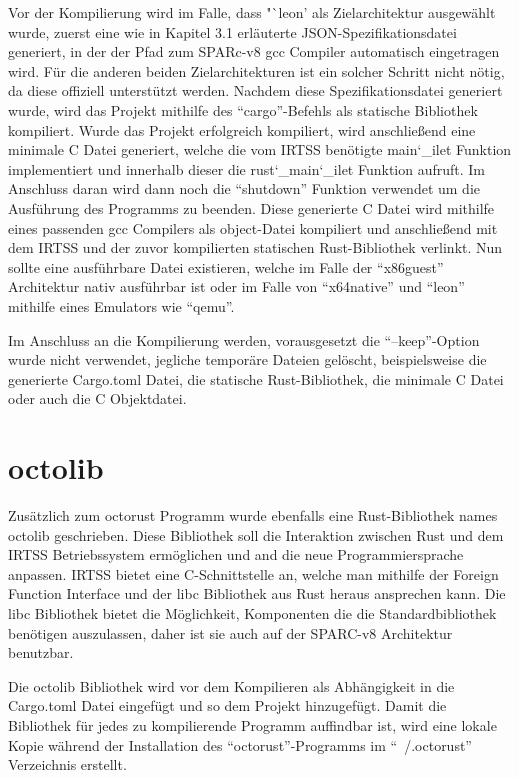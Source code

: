 Vor der Kompilierung wird im Falle, dass "`leon' als Zielarchitektur ausgewählt wurde, zuerst eine wie in Kapitel 3.1 erläuterte
JSON-Spezifikationsdatei generiert, in der der Pfad zum SPARc-v8 gcc Compiler automatisch eingetragen wird. Für die anderen beiden
Zielarchitekturen ist ein solcher Schritt nicht nötig, da diese offiziell unterstützt werden. 
Nachdem diese Spezifikationsdatei generiert wurde, wird das Projekt mithilfe des "`cargo"'-Befehls als statische Bibliothek 
kompiliert. Wurde das Projekt erfolgreich kompiliert, wird anschließend eine minimale C Datei generiert,
welche die vom IRTSS benötigte main\char`_ilet Funktion implementiert und innerhalb
dieser die rust\char`_main\char`_ilet Funktion aufruft. Im Anschluss daran wird dann noch die "`shutdown"' Funktion verwendet um die 
Ausführung des Programms zu beenden. Diese generierte C Datei wird mithilfe eines passenden gcc Compilers als object-Datei kompiliert
und anschließend mit dem IRTSS und der zuvor kompilierten statischen Rust-Bibliothek verlinkt. Nun sollte eine ausführbare Datei
existieren, welche im Falle der "`x86guest"' Architektur nativ ausführbar ist oder im Falle von "`x64native"' und "`leon"'
mithilfe eines Emulators wie "`qemu"'.

Im Anschluss an die Kompilierung werden, vorausgesetzt die "`--keep"'-Option wurde nicht verwendet, jegliche temporäre Dateien
gelöscht, beispielsweise die generierte Cargo.toml Datei, die statische Rust-Bibliothek, die minimale C Datei oder auch die C
Objektdatei.

\section{octolib}

Zusätzlich zum octorust Programm wurde ebenfalls eine Rust-Bibliothek names octolib geschrieben. Diese Bibliothek soll
die Interaktion zwischen Rust und dem IRTSS Betriebssystem ermöglichen und and die neue Programmiersprache anpassen. IRTSS
bietet eine C-Schnittstelle an, welche man mithilfe der Foreign Function Interface und der libc Bibliothek aus Rust heraus ansprechen
kann. Die libc Bibliothek bietet die Möglichkeit, Komponenten die die Standardbibliothek benötigen auszulassen, daher ist sie
auch auf der SPARC-v8 Architektur benutzbar.

Die octolib Bibliothek wird vor dem Kompilieren als Abhängigkeit in die Cargo.toml Datei eingefügt und so dem Projekt hinzugefügt.
Damit die Bibliothek für jedes zu kompilierende Programm auffindbar ist, wird eine lokale Kopie während der Installation des
"`octorust"'-Programms im "`~/.octorust"' Verzeichnis erstellt.

